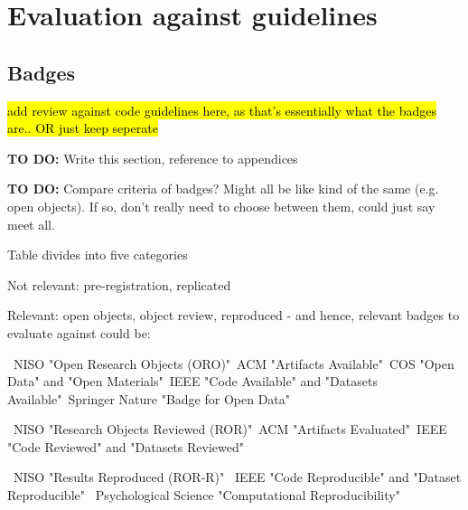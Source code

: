 \section{Evaluation against guidelines}

\subsection{Badges} \label{sec:badges}
\timeno

\hl{add review against code guidelines here, as that's essentially what the badges are.. OR just keep seperate}


\textbf{TO DO:} Write this section, reference to appendices

\textbf{TO DO:} Compare criteria of badges? Might all be like kind of the same (e.g. open objects). If so, don't really need to choose between them, could just say meet all.

Table divides into five categories

Not relevant: pre-registration, replicated

Relevant: open objects, object review, reproduced - and hence, relevant badges to evaluate against could be:

\textbullet\ NISO "Open Research Objects (ORO)"\newline \textbullet\ ACM "Artifacts Available"\newline \textbullet\ COS "Open Data" and "Open Materials"\newline \textbullet\ IEEE "Code Available" and "Datasets Available"\newline \textbullet\ Springer Nature "Badge for Open Data"

\textbullet\ NISO "Research Objects Reviewed (ROR)"\newline \textbullet\ ACM "Artifacts Evaluated"\newline \textbullet\ IEEE "Code Reviewed" and "Datasets Reviewed"

\textbullet\ NISO "Results Reproduced (ROR-R)" \newline \textbullet\ IEEE "Code Reproducible" and "Dataset Reproducible" \newline \textbullet\ Psychological Science "Computational Reproducibility"

